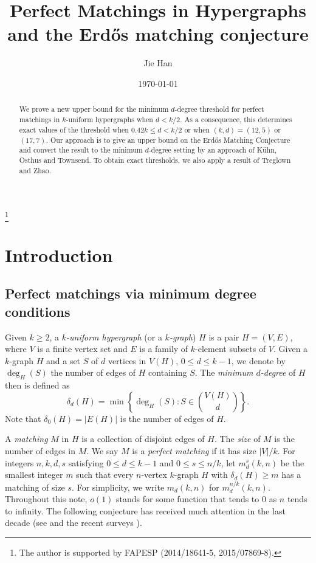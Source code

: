 \documentclass{amsart}
\theoremstyle{plain}
\numberwithin{equation}{section}
\numberwithin{theorem}{section}
\numberwithin{case}{section}
\numberwithin{subcase}{case}
\begin{document}
\title[Perfect Matchings in Hypergraphs]{Perfect Matchings in Hypergraphs and the Erd\H{o}s matching conjecture}
\author{Jie Han}
\address{School of Mathematics, University of Birmingham, Birmingham, B15 2TT, UK}
\thanks{The author is supported by FAPESP (2014/18641-5, 2015/07869-8).}
\date{\today}
 
\begin{abstract}
We prove a new upper bound for the minimum $d$-degree threshold for perfect matchings in $k$-uniform hypergraphs when $d<k/2$.
As a consequence, this determines exact values of the threshold when $0.42k \le d < k/2$ or when $(k,d)=(12,5)$ or $(17,7)$.
Our approach is to give an upper bound on the Erd\H{o}s Matching Conjecture and convert the result to the minimum $d$-degree setting by an approach of K\"uhn, Osthus and Townsend.
To obtain exact thresholds, we also apply a result of Treglown and Zhao.
\end{abstract}

\maketitle

\section{Introduction}

\subsection{Perfect matchings via minimum degree conditions}

Given $k\ge 2$, a \emph{$k$-uniform hypergraph} (or a \emph{$k$-graph}) $H$ is a pair $H=(V, E)$, where $V$ is a finite vertex set and $E$ is a family of $k$-element subsets of $V$.
Given a $k$-graph $H$ and a set $S$ of $d$ vertices in $V(H)$, $0\le d\le k-1$, we denote by $\deg_H(S)$ the number of edges of $H$ containing $S$.
The \emph{minimum $d$-degree} of $H$ then is defined as
\[
\delta_d(H) = \min\left\{ \deg_H(S): S\in \binom{V(H)}{d} \right\}.
\]
Note that $\delta_0(H)=|E(H)|$ is the number of edges of $H$.

A \emph{matching} $M$ in $H$ is a collection of disjoint edges of $H$.
The \emph{size} of $M$ is the number of edges in $M$.
We say $M$ is a \emph{perfect matching} if it has size $|V|/k$.
For integers $n,k,d,s$ satisfying $0\le d\le k-1$ and $0\le s \le n/k$, let $m_d^s(k,n)$ be the smallest integer $m$ such that every $n$-vertex $k$-graph $H$ with $\delta_d(H)\ge m$ has a matching of size $s$.
For simplicity, we write $m_d(k,n)$ for $m_d^{n/k}(k,n)$.
Throughout this note, $o(1)$ stands for some function that tends to $0$ as $n$ tends to infinity.
The following conjecture \cite{HPS, KuOs-survey} has received much attention in the last decade (see \cite{AFHRRS, CzKa, HPS, Han14_mat, Han15_mat, Khan1, Khan2, KO06mat, KOT, MaRu, Pik, RRS06mat, RRS09, TrZh12, TrZh13, TrZh15} and the recent surveys \cite{RR, zsurvey}). 
\end{document}
